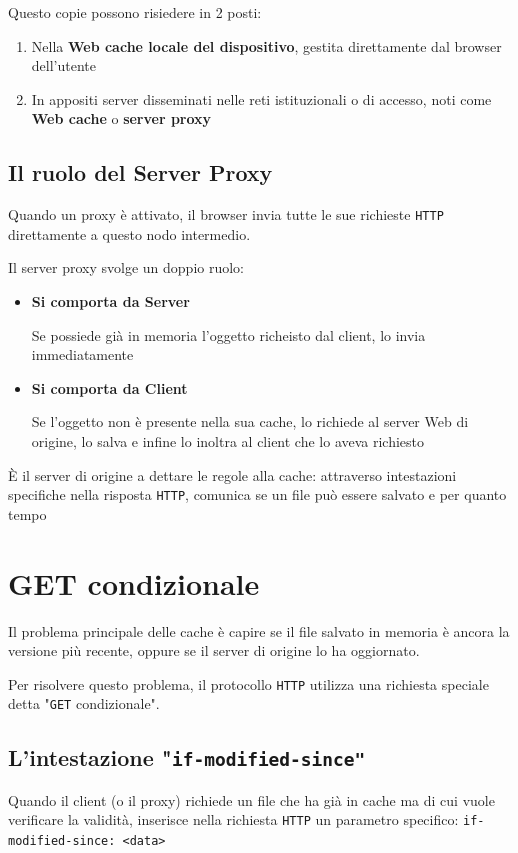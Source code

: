 Questo copie possono risiedere in 2 posti:

\begin{enumerate}
    \item Nella \textbf{Web cache locale del dispositivo}, gestita direttamente dal browser dell'utente
    \item In appositi server disseminati nelle reti istituzionali o di accesso, noti come \textbf{Web cache} o \textbf{server proxy}
\end{enumerate}

\subsection{Il ruolo del Server Proxy}
Quando un proxy è attivato, il browser invia tutte le sue richieste \texttt{HTTP} direttamente a questo nodo intermedio.

Il server proxy svolge un doppio ruolo:

\begin{itemize}
    \item \textbf{Si comporta da Server}

    Se possiede già in memoria l'oggetto richeisto dal client, lo invia immediatamente

    \item \textbf{Si comporta da Client}

    Se l'oggetto non è presente nella sua cache, lo richiede al server Web di origine, lo salva e infine lo inoltra al client che lo aveva richiesto
\end{itemize}

È il server di origine a dettare le regole alla cache: attraverso intestazioni specifiche nella risposta \texttt{HTTP}, comunica se un file può essere salvato e per quanto tempo

\section{GET condizionale}
Il problema principale delle cache è capire se il file salvato in memoria è ancora la versione più recente, oppure se il server di origine lo ha oggiornato.

Per risolvere questo problema, il protocollo \texttt{HTTP} utilizza una richiesta speciale detta "\texttt{GET} condizionale".

\subsection{L'intestazione "\texttt{if-modified-since"}}
Quando il client (o il proxy) richiede un file che ha già in cache ma di cui vuole verificare la validità, inserisce nella richiesta \texttt{HTTP} un parametro specifico: \texttt{if-modified-since: <data>}

